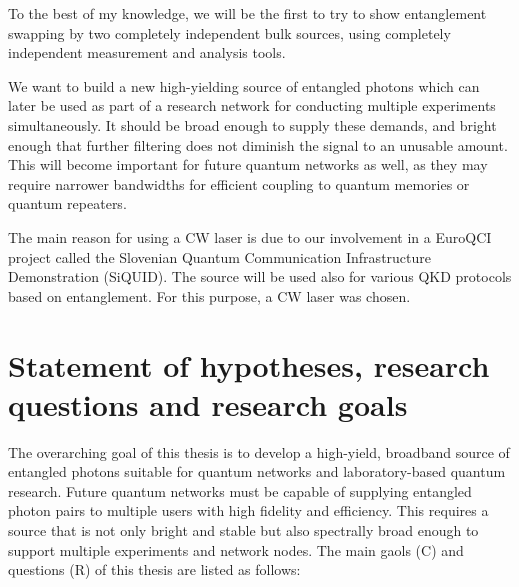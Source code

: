 \documentclass{article}
\theoremstyle{mytheoremstyle}
\theoremstyle{mytheoremstyle}
\theoremstyle{myproblemstyle}
\begin{document}
To the best of my knowledge, we will be the first to try to show entanglement swapping by two completely independent bulk sources, using completely independent measurement
and analysis tools.
\par We want to build a new high-yielding source of entangled photons which can later be used as part of a research network
for conducting multiple experiments simultaneously. It should be broad enough to supply these demands, and bright enough
that further filtering does not diminish the signal to an unusable amount. This will become important for future quantum
networks as well, as they may require narrower bandwidths for efficient coupling to quantum memories or quantum repeaters.
\par The main reason for using a CW laser is due to our involvement in a EuroQCI project called the Slovenian Quantum Communication Infrastructure Demonstration (SiQUID).
The source will be used also for various QKD protocols based on entanglement. For this purpose, a CW laser was chosen.


\section{Statement of hypotheses, research questions and research goals}


The overarching goal of this thesis is to develop a high-yield,
broadband source of entangled photons suitable for quantum networks and laboratory-based quantum research.
Future quantum networks must be capable of supplying entangled photon pairs to multiple users with high fidelity and efficiency.
This requires a source that is not only bright and stable but also spectrally broad enough to support multiple experiments and network nodes.
The main gaols (C) and questions (R) of this thesis are listed as follows:
\end{document}
